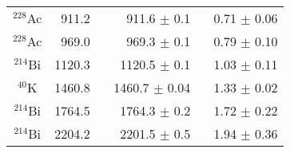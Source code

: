 \begin{table}
\begin{tabular}{  c | r | r | c  }
					$^{228}$Ac     & 911.2     ~ & 911.6      ${\pm}$ 0.1       ~ & 0.71       ${\pm}$ 0.06       \\
					$^{228}$Ac     & 969.0     ~ & 969.3      ${\pm}$ 0.1       ~ & 0.79       ${\pm}$ 0.10       \\
					$^{214}$Bi     & 1120.3    ~ & 1120.5     ${\pm}$ 0.1       ~ & 1.03       ${\pm}$ 0.11       \\
					$^{40}$K       & 1460.8    ~ & 1460.7     ${\pm}$ 0.04       ~ & 1.33       ${\pm}$ 0.02       \\
					$^{214}$Bi     & 1764.5    ~ & 1764.3     ${\pm}$ 0.2       ~ & 1.72       ${\pm}$ 0.22       \\
					$^{214}$Bi     & 2204.2    ~ & 2201.5     ${\pm}$ 0.5       ~ & 1.94       ${\pm}$ 0.36       \\

\end{tabular}
\end{table}
